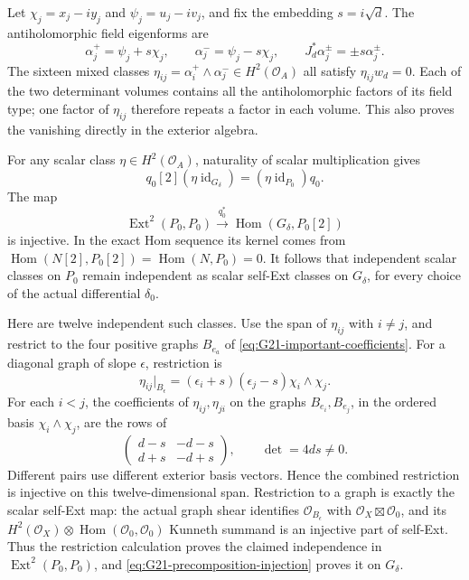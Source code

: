 Let \(\chi_j=x_j-iy_j\) and \(\psi_j=u_j-iv_j\), and fix
the embedding \(s=i\sqrt d\). The antiholomorphic field eigenforms
are
\[
 \alpha_j^+=\psi_j+s\chi_j,\qquad
 \alpha_j^-=\psi_j-s\chi_j,
 \qquad J_d^*\alpha_j^\pm=\pm s\alpha_j^\pm.
\]
The sixteen mixed classes
\(\eta_{ij}=\alpha_i^+\wedge\alpha_j^-\in H^2(\mathcal O_A)\)
all satisfy \(\eta_{ij}w_d=0\). Each of the two determinant
volumes contains all the antiholomorphic factors of its field type;
one factor of \(\eta_{ij}\) therefore repeats a factor in each
volume. This also proves the vanishing directly in the exterior
algebra.

For any scalar class \(\eta\in H^2(\mathcal O_A)\), naturality
of scalar multiplication gives
\[
 q_0[2](\eta\operatorname{id}_{G_\delta})
                 =(\eta\operatorname{id}_{P_0})q_0.
\]
The map
\begin{equation}\label{eq:G21-precomposition-injection}
 \operatorname{Ext}^2(P_0,P_0)
       \xrightarrow{\ q_0^*\ }\operatorname{Hom}(G_\delta,P_0[2])
\end{equation}
is injective. In the exact Hom sequence its kernel comes from
\(\operatorname{Hom}(N[2],P_0[2])=\operatorname{Hom}(N,P_0)=0\).
It follows that independent scalar classes on \(P_0\) remain
independent as scalar self-Ext classes on \(G_\delta\), for every
choice of the actual differential \(\delta_0\).

Here are twelve independent such classes. Use the span of
\(\eta_{ij}\) with \(i\ne j\), and restrict to the four positive
graphs \(B_{e_a}\) of \eqref{eq:G21-important-coefficients}.
For a diagonal graph of slope \(\epsilon\), restriction is
\[
 \eta_{ij}|_{B_\epsilon}
       =(\epsilon_i+s)(\epsilon_j-s)\chi_i\wedge\chi_j.
\]
For each \(i<j\), the coefficients of \(\eta_{ij},\eta_{ji}\)
on the graphs \(B_{e_i},B_{e_j}\), in the ordered basis
\(\chi_i\wedge\chi_j\), are the rows of
\[
 \begin{pmatrix}
  d-s&-d-s\\ d+s&-d+s
 \end{pmatrix},\qquad \det=4ds\ne0.
\]
Different pairs use different exterior basis vectors. Hence the
combined restriction is injective on this twelve-dimensional span.
Restriction to a graph is exactly the scalar self-Ext map: the actual
graph shear identifies \(\mathcal O_{B_\epsilon}\) with
\(\mathcal O_X\boxtimes\mathcal O_0\), and its
\(H^2(\mathcal O_X)\otimes\operatorname{Hom}(\mathcal O_0,\mathcal O_0)\)
Kunneth summand is an injective part of self-Ext. Thus the restriction
calculation proves the claimed independence in
\(\operatorname{Ext}^2(P_0,P_0)\), and
\eqref{eq:G21-precomposition-injection} proves it on \(G_\delta\).

